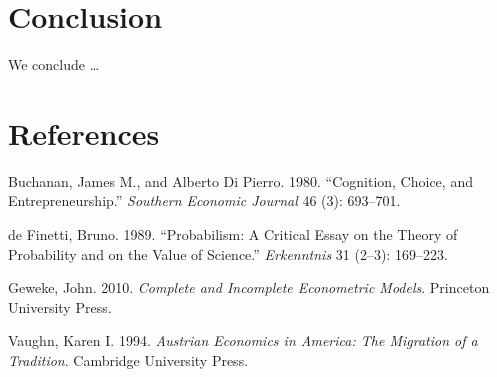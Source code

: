 \documentclass[
  letterpaper,
  DIV=11,
  numbers=noendperiod]{scrartcl}
\newlength{\cslhangindent}
\newenvironment{CSLReferences}[2] %
 {\begin{list}{}{%
  \setlength{\itemindent}{0pt}
  \setlength{\leftmargin}{0pt}
  \setlength{\parsep}{0pt}
  \ifodd #1
   \setlength{\leftmargin}{\cslhangindent}
   \setlength{\itemindent}{-1\cslhangindent}
  \fi
  \setlength{\itemsep}{#2\baselineskip}}}
 {\end{list}}
\begin{document}
\newpage

\section{Conclusion}\label{conclusion}

We conclude \ldots{}

\newpage

\section*{References}\label{references}

\label{refs}
\begin{CSLReferences}{1}{0}
Buchanan, James M., and Alberto Di Pierro. 1980. {``{Cognition, Choice,
and Entrepreneurship}.''} \emph{{Southern Economic Journal}} 46 (3):
693--701.

de Finetti, Bruno. 1989. {``{Probabilism}: {A Critical Essay on the
Theory of Probability and on the Value of Science}.''}
\emph{{Erkenntnis}} {31} ({2--3}): 169--223.

Geweke, John. 2010. \emph{{Complete and Incomplete Econometric Models}}.
{Princeton University Press}.

Vaughn, Karen I. 1994. \emph{{Austrian Economics in America}: {The
Migration of a Tradition}}. {Cambridge University Press}.

\end{CSLReferences}
\end{document}
